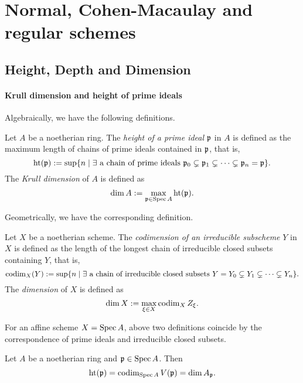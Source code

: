 \section{Normal, Cohen-Macaulay and regular schemes}

\subsection{Height, Depth and Dimension }

    \paragraph{Krull dimension and height of prime ideals}
    Algebraically, we have the following definitions.
    \begin{definition}\label{def: height of ideals}
        Let $A$ be a noetherian ring.
        The \textit{height of a prime ideal} ${\mathfrak{p}}$ in $A$ is defined as the maximum length of chains of prime ideals contained in ${\mathfrak{p}}$, that is, 
        \[ \operatorname{ht}({\mathfrak{p}}) := \sup\{ n \mid \exists \text{ a chain of prime ideals } {\mathfrak{p}}_0 \subsetneq {\mathfrak{p}}_1 \subsetneq \cdots \subsetneq {\mathfrak{p}}_n = {\mathfrak{p}}\}. \] 
        The \textit{Krull dimension} of $A$ is defined as 
        \[ \dim A := \max_{{\mathfrak{p}} \in \operatorname{Spec} A}\operatorname{ht}({\mathfrak{p}}). \]
    \end{definition}

    Geometrically, we have the corresponding definition.
    \begin{definition}\label{def: dimension of schemes}
        Let $X$ be a noetherian scheme.
        The \textit{codimension of an irreducible subscheme} $Y$ in $X$ is defined as the length of the longest chain of irreducible closed subsets containing $Y$, that is, 
        \[ \operatorname{codim}_X(Y) := \sup\{ n \mid \exists \text{ a chain of irreducible closed subsets } Y = Y_0 \subsetneq Y_1 \subsetneq \cdots \subsetneq Y_n\}. \] 
        The \textit{dimension} of $X$ is defined as
        \[ \dim X := \max_{\xi \in X}\operatorname{codim}_X Z_\xi. \]
    \end{definition}

    For an affine scheme $X = \operatorname{Spec} A$, above two definitions coincide by the correspondence of prime ideals and irreducible closed subsets.

    \begin{proposition}\label{prop: dimension of localization, height and codimension}
        Let $A$ be a noetherian ring and ${\mathfrak{p}} \in \operatorname{Spec} A$.
        Then 
        \[ \operatorname{ht}({\mathfrak{p}}) = \operatorname{codim}_{\operatorname{Spec} A} V({\mathfrak{p}}) = \dim A_{{\mathfrak{p}}}. \]
    \end{proposition}

